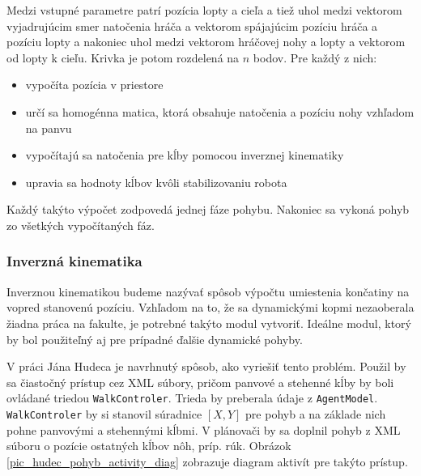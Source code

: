 Medzi vstupné parametre patrí pozícia lopty a cieľa a tiež uhol medzi vektorom vyjadrujúcim smer natočenia hráča a vektorom spájajúcim pozíciu hráča a pozíciu lopty a nakoniec uhol medzi vektorom hráčovej nohy a lopty a vektorom od lopty k cieľu. Krivka je potom rozdelená na $n$ bodov. Pre každý z nich:

\begin{itemize}
 \item vypočíta pozícia v priestore
 \item určí sa homogénna matica, ktorá obsahuje natočenia a pozíciu nohy vzhľadom na panvu
 \item vypočítajú sa natočenia pre kĺby pomocou inverznej kinematiky
 \item upravia sa hodnoty kĺbov kvôli stabilizovaniu robota
\end{itemize}
Každý takýto výpočet zodpovedá jednej fáze pohybu. Nakoniec sa vykoná pohyb zo všetkých vypočítaných fáz.

\subsubsection{Inverzná kinematika}
Inverznou kinematikou budeme nazývať spôsob výpočtu umiestenia končatiny na vopred stanovenú pozíciu. Vzhľadom na to, že sa dynamickými kopmi nezaoberala žiadna práca na fakulte, je potrebné takýto modul vytvoriť. Ideálne modul, ktorý by bol použiteľný aj pre prípadné ďalšie dynamické pohyby. 

V práci Jána Hudeca\cite{hudec} je navrhnutý spôsob, ako vyriešiť tento problém. Použil by sa čiastočný prístup cez XML súbory, pričom panvové a stehenné kĺby by boli ovládané triedou \texttt{WalkControler}. Trieda by preberala údaje z \texttt{AgentModel}. \texttt{WalkControler} by si stanovil súradnice $[X,Y]$ pre pohyb a na základe nich pohne panvovými a stehennými kĺbmi. V plánovači by sa doplnil pohyb z XML súboru o pozície ostatných kĺbov nôh, príp. rúk. Obrázok \ref{pic_hudec_pohyb_activity_diag} zobrazuje diagram aktivít pre takýto prístup.

